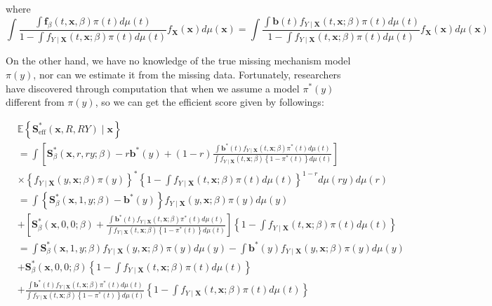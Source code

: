 \documentclass[11pt]{article}
\begin{document}
where 
$$
\int \frac{\int \mathbf{f}_\beta(t, \mathbf{x}, \beta) \pi(t) d \mu(t)}{1-\int f_{Y \mid \mathbf{X}}(t, \mathbf{x} ; \beta) \pi(t) d \mu(t)} f_{\mathbf{X}}(\mathbf{x}) d \mu(\mathbf{x})=\int \frac{\int \mathbf{b}(t) f_{Y \mid \mathbf{X}}(t, \mathbf{x} ; \beta) \pi(t) d \mu(t)}{1-\int f_{Y \mid \mathbf{X}}(t, \mathbf{x} ; \beta) \pi(t) d \mu(t)} f_{\mathbf{X}}(\mathbf{x}) d \mu(\mathbf{x})
$$

On the other hand, we have no knowledge of the true missing mechanism model $\pi(y)$, nor can we estimate it from the missing data. Fortunately, researchers have discovered through computation that when we assume a model $\pi^*(y)$ different from $\pi(y)$, so we can get the efficient score given by followings:

$$
\begin{aligned}
& \mathbb{E}\left\{\mathbf{S}_{\mathrm{eff}}^*(\mathbf{x}, R, R Y) \mid \mathbf{x}\right\} \\
& =\int\left[\mathbf{S}_\beta^*(\mathbf{x}, r, r y ; \beta)-r \mathbf{b}^*(y)+(1-r) \frac{\int \mathbf{b}^*(t) f_{Y \mid \mathbf{X}}(t, \mathbf{x} ; \beta) \pi^*(t) d \mu(t)}{\int f_{Y \mid \mathbf{X}}(t, \mathbf{x} ; \beta)\left\{1-\pi^*(t)\right\} d \mu(t)}\right] \\
& \times\left\{f_{Y \mid \mathbf{X}}(y, \mathbf{x} ; \beta) \pi(y)\right\}^*\left\{1-\int f_{Y \mid \mathbf{X}}(t, \mathbf{x} ; \beta) \pi(t) d \mu(t)\right\}^{1-r} d \mu(r y) d \mu(r) \\
& =\int\left\{\mathbf{S}_\beta^*(\mathbf{x}, 1, y ; \beta)-\mathbf{b}^*(y)\right\} f_{Y \mid \mathbf{X}}(y, \mathbf{x} ; \beta) \pi(y) d \mu(y) \\
& +\left[\mathbf{S}_\beta^*(\mathbf{x}, 0,0 ; \beta)+\frac{\int \mathbf{b}^*(t) f_{Y \mid \mathbf{X}}(t, \mathbf{x} ; \beta) \pi^*(t) d \mu(t)}{\int f_{Y \mid \mathbf{X}}(t, \mathbf{x} ; \beta)\left\{1-\pi^*(t)\right\} d \mu(t)}\right]\left\{1-\int f_{Y \mid \mathbf{X}}(t, \mathbf{x} ; \beta) \pi(t) d \mu(t)\right\} \\
& =\int \mathbf{S}_\beta^*(\mathbf{x}, 1, y ; \beta) f_{Y \mid \mathbf{X}}(y, \mathbf{x} ; \beta) \pi(y) d \mu(y)-\int \mathbf{b}^*(y) f_{Y \mid \mathbf{X}}(y, \mathbf{x} ; \beta) \pi(y) d \mu(y) \\
& +\mathbf{S}_\beta^*(\mathbf{x}, 0,0 ; \beta)\left\{1-\int f_{Y \mid \mathbf{X}}(t, \mathbf{x} ; \beta) \pi(t) d \mu(t)\right\} \\
& +\frac{\int \mathbf{b}^*(t) f_{Y \mid \mathbf{X}}(t, \mathbf{x} ; \beta) \pi^*(t) d \mu(t)}{\int f_{Y \mid \mathbf{X}}(t, \mathbf{x} ; \beta)\left\{1-\pi^*(t)\right\} d \mu(t)}\left\{1-\int f_{Y \mid \mathbf{X}}(t, \mathbf{x} ; \beta) \pi(t) d \mu(t)\right\} \\

\end{aligned}$$
\end{document}
